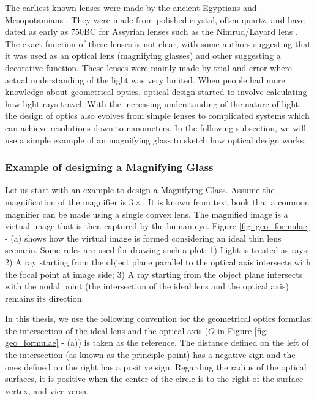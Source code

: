 The earliest known lenses were made by the ancient Egyptians and Mesopotamians \cite{wiki:HistoryofOptics}. They were made from polished crystal, often quartz, and have dated as early as 750BC for Assyrian lenses such as the Nimrud/Layard lens \cite{wiki:Nimrudlens}. The exact function of these lenses is not clear, with some authors suggesting that it was used as an optical lens (magnifying glasses) and other suggesting a decorative function. These lenses were mainly made by trial and error where actual understanding of the light was very limited. When people had more knowledge about geometrical optics, optical design started to involve calculating how light rays travel. With the increasing understanding of the nature of light, the design of optics also evolves from simple lenses to complicated systems which can achieve resolutions down to nanometers. In the following subsection, we will use a simple example of an magnifying glass to sketch how optical design works.     


\subsubsection{Example of designing a Magnifying Glass} \label{magnifier}
\vspace{1em}
Let us start with an example to design a Magnifying Glass. Assume the magnification of the magnifier is $3\times$. It is known from text book\cite{hecht2012optics} that a common magnifier can be made using a single convex lens. The magnified image is a virtual image that is then captured by the human-eye. Figure \ref{fig: geo_formulae} - (a) shows how the virtual image is formed considering an ideal thin lens scenario. Some rules are used for drawing such a plot:
1) Light is treated as rays;
2) A ray starting from the object plane parallel to the optical axis intersects with the focal point at image side;
3) A ray starting from the object plane intersects with the nodal point (the intersection of the ideal lens and the optical axis) remains its direction.

In this thesis, we use the following convention for the geometrical optics formulas: the intersection of the ideal lens and the optical axis ($O$ in Figure \ref{fig: geo_formulae} - (a)) is taken as the reference. The distance defined on the left of the intersection (as known as the principle point) has a negative sign and the ones defined on the right has a positive sign. Regarding the radius of the optical surfaces, it is positive when the center of the circle is to the right of the surface vertex, and vice versa. 

